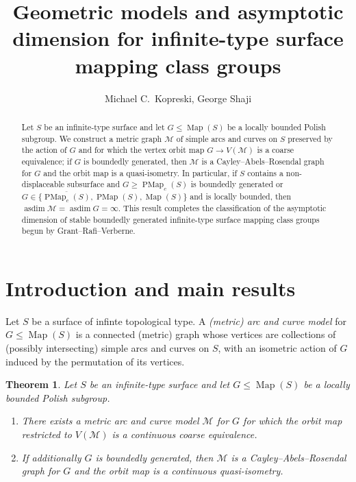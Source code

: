 \documentclass[twoside]{amsart}
\theoremstyle{plain}
\newtheorem{theorem}{Theorem}[section]
\theoremstyle{break}
\theoremstyle{definition}
\theoremstyle{remark}
\DeclareMathOperator{\Map}{Map}
\DeclareMathOperator{\asdim}{asdim}
\newcommand{\M}{\mathcal M}
\DeclareMathOperator{\PMap}{PMap}
\begin{document}
\title[Geometric models for surface mapping class groups]
{Geometric models and asymptotic dimension for 
  infinite-type surface mapping class
groups}
\author{Michael C.\ Kopreski, George Shaji}

\begin{abstract}
  Let $S$ be an infinite-type surface and let $G \leq \Map(S)$ be a
  locally bounded Polish subgroup.
  We construct a metric graph $\M$ of simple arcs and
  curves on $S$ preserved by the action of 
  $G$ and for which the vertex orbit map $G \to V(\M)$ is a coarse
  equivalence; if $G$ is boundedly generated, then $\M$ is a
Cayley--Abels--Rosendal graph for $G$ and the orbit map is a
quasi-isometry. In particular, if $S$ contains a non-displaceable
subsurface and $G \geq \PMap_c(S)$ is boundedly generated or 
$G \in \{\overline{\PMap_c(S)},
  \PMap(S), \Map(S) \}$ and is locally bounded,
  then $\asdim \M = \asdim G = \infty$.
  This result completes
  the classification of the asymptotic dimension of stable
  boundedly generated infinite-type surface mapping class groups begun by
  Grant--Rafi--Verberne.
\end{abstract}

\maketitle

\section{Introduction and main results}\label{sec:intro}

Let $S$ be a surface of infinte topological type.  A
\textit{(metric) arc and curve model} for 
$G \leq \Map(S)$ is a connected (metric) 
graph whose vertices are collections of (possibly intersecting)
simple arcs and curves on
$S$, with an isometric action of $G$ induced by the
permutation of its vertices.  

\begin{theorem}\label{thm:model} 
  Let $S$ be an infinite-type surface and let $G \leq \Map(S)$ be a locally bounded
  Polish subgroup.
  \begin{enumerate}
    \item There exists a metric arc and curve model $\M$ for
  $G$ for which the orbit map restricted to $V(\mathcal{M})$ is a continuous 
  coarse equivalence.
    \item  
  If additionally $G$ is boundedly generated, then $\M$
  is a Cayley--Abels--Rosendal graph for $G$ and the
  orbit map %
  is a continuous quasi-isometry.
  \end{enumerate}
\end{theorem}
\end{document}
